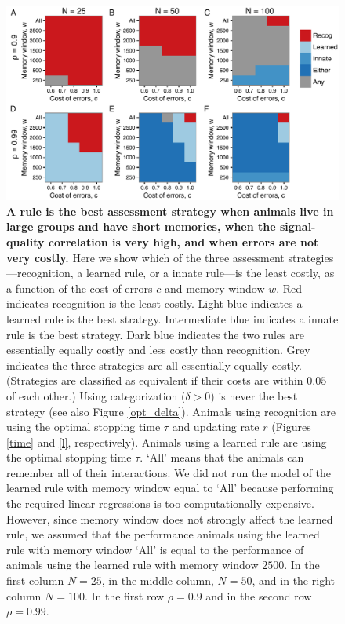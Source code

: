 \begin{figure}
\includegraphics[width=6.85in]{figures/best_type_of_learning.pdf}
\caption{\sffamily\small\textbf{A rule is the best assessment strategy when animals live in large groups and have short memories, when the signal-quality correlation is very high, and when errors are not very costly.} Here we show which of the three assessment strategies---recognition, a learned rule, or a innate rule---is the least costly, as a function of the cost of errors $c$ and memory window $w$. Red indicates recognition is the least costly. Light blue indicates a learned rule is the best strategy. Intermediate blue indicates a innate rule is the best strategy. Dark blue indicates the two rules are essentially equally costly and less costly than recognition. Grey indicates the three strategies are all essentially equally costly. (Strategies are classified as equivalent if their costs are within $0.05$ of each other.) Using categorization ($\delta>0$) is never the best strategy (see also Figure \ref{opt_delta}). Animals using recognition are using the optimal stopping time $\tau$ and updating rate $r$ (Figures \ref{time} and \ref{l}, respectively). Animals using a learned rule are using the optimal stopping time $\tau$. `All' means that the animals can remember all of their interactions. We did not run the model of the learned rule with memory window equal to `All' because performing the required linear regressions is too computationally expensive. However, since memory window does not strongly affect the learned rule, we assumed that the performance animals using the learned rule with memory window `All' is equal to the performance of animals using the learned rule with memory window $2500$. In the first column $N=25$, in the middle column, $N=50$, and in the right column $N=100$. In the first row $\rho=0.9$ and in the second row $\rho=0.99$.}
\label{best}
\end{figure}

